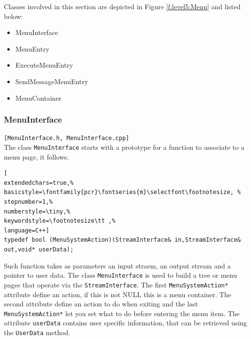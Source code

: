 Classes involved in this section are depicted in Figure \ref{f:level5:Menu} and listed below:
\begin{itemize}
 \item MenuInterface
 \item MenuEntry
 \item ExecuteMenuEntry
 \item SendMessageMenuEntry
 \item MenuContainer
\end{itemize}



\subsubsection{MenuInterface}
\texttt{[MenuInterface.h, MenuInterface.cpp]}\\
The class \texttt{MenuInterface} starts with a prototype for a function to associate to a menu page, it follows.

\begin{lstlisting}[
extendedchars=true,%
basicstyle=\fontfamily{pcr}\fontseries{m}\selectfont\footnotesize, %
stepnumber=1,%
numberstyle=\tiny,%
keywordstyle=\footnotesize\tt ,%
language=C++]
typedef bool (MenuSystemAction)(StreamInterface& in,StreamInterface& out,void* userData);
\end{lstlisting}

Such function takes as parameters an input straem, an output stream and a pointer to user data.
The class \texttt{MenuInterface} is used to build a tree or menu pages that operate via the \texttt{StreamInterface}.
The first \texttt{MenuSystemAction*} attribute define an action, if this is not NULL this is a menu container. The second attribute define an action to do when exiting and the last \texttt{MenuSystemAction*} let you set what to do before entering the menu item. The attribute \texttt{userData} contains user specific information, that can be retrieved using the \texttt{UserData} method. \\


